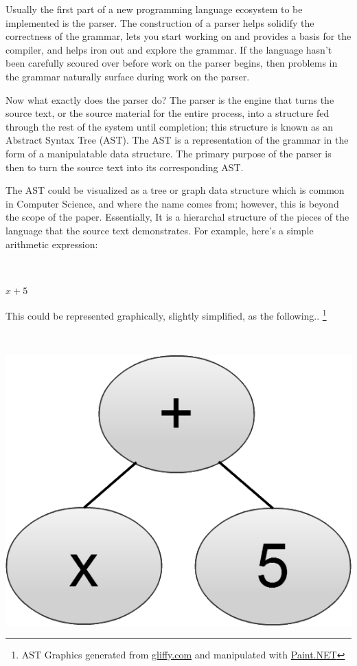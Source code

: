 \documentclass[titlepage]{article}
\begin{document}
			Usually the first part of a new programming language ecosystem to be implemented is the parser.  The construction of a parser helps solidify the correctness of the grammar, lets you start working on and provides a basis for the compiler, and helps iron out and explore the grammar.  If the language hasn't been carefully scoured over before work on the parser begins, then problems in the grammar naturally surface during work on the parser.

			Now what exactly does the parser do?  The parser is the engine that turns the source text, or the source material for the entire process, into a structure fed through the rest of the system until completion; this structure is known as an Abstract Syntax Tree (AST).  The AST is a representation of the grammar in the form of a manipulatable data structure.  The primary purpose of the parser is then to turn the source text into its corresponding AST.

			The AST could be visualized as a tree or graph data structure which is common in Computer Science, and where the name comes from; however, this is beyond the scope of the paper.  Essentially, It is a hierarchal structure of the pieces of the language that the source text demonstrates.  For example, here's a simple arithmetic expression:
			\newline

			~\centerline{\Large{$x + 5$}}
			\newline

			This could be represented graphically, slightly simplified, as the following..
			\footnote{AST Graphics generated from \href{http://www.gliffy.com}{gliffy.com} and manipulated with \href{http://www.getpaint.net/}{Paint.NET}}
			\newline

			~\centerline{\includegraphics[scale=.3]{SimpleAST.png}}
			\newline
\end{document}
